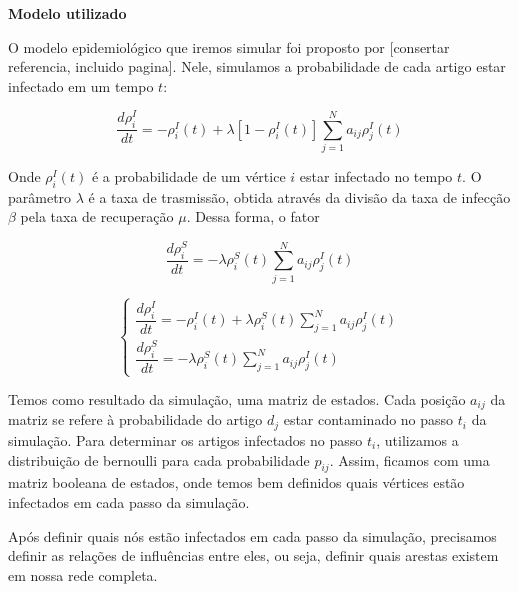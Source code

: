 \documentclass[a4paper,12pt]{article}
\begin{document}
 \begin{description}
  \item \textbf{Modelo utilizado}
    
    O modelo epidemiológico que iremos simular foi proposto por \cite{pastor2014epidemic} [consertar referencia, incluido pagina]. Nele,
    simulamos a probabilidade de cada artigo estar infectado em um tempo $t$:

    \begin{equation}
      \dfrac{d\rho^{I}_{i}}{dt} = -\rho^{I}_{i}(t) + \lambda[1- \rho_{i}^{I}(t)] \sum_{j=1}^{N} a_{ij}\rho_{j}^{I}(t)    
    \end{equation}

    Onde $\rho^{I}_{i}(t)$ é a probabilidade de um vértice $i$ estar infectado no tempo $t$. O parâmetro $\lambda$ é a taxa de trasmissão,
    obtida através da divisão da taxa de infecção $\beta$ pela taxa de recuperação $\mu$. Dessa forma, o fator

    \begin{equation}
      \dfrac{d\rho^{S}_{i}}{dt} = - \lambda\rho_{i}^{S}(t) \sum_{j=1}^{N} a_{ij}\rho_{j}^{I}(t)
    \end{equation}
    
    \begin{equation}
      \begin{cases}
	\dfrac{d\rho^{I}_{i}}{dt} = -\rho^{I}_{i}(t) + \lambda\rho_{i}^{S}(t) \sum_{j=1}^{N} a_{ij}\rho_{j}^{I}(t) \\   
	\dfrac{d\rho^{S}_{i}}{dt} = - \lambda\rho_{i}^{S}(t) \sum_{j=1}^{N} a_{ij}\rho_{j}^{I}(t)
      \end{cases}
    \end{equation}

   
 \end{description}

  
  Temos como resultado da simulação, uma matriz de estados. Cada posição $a_{ij}$ da matriz se refere à probabilidade do artigo
  $d_{j}$ estar contaminado no passo $t_{i}$ da simulação. Para determinar os artigos infectados no passo $t_{i}$, utilizamos a distribuição
  de bernoulli para cada probabilidade $p_{ij}$. Assim, ficamos com uma matriz booleana de estados, onde temos bem definidos quais
  vértices estão infectados em cada passo da simulação.
  
  Após definir quais nós estão infectados em cada passo da simulação, precisamos definir as relações de influências entre eles, ou seja,
  definir quais arestas existem em nossa rede completa.
  
\end{document}
